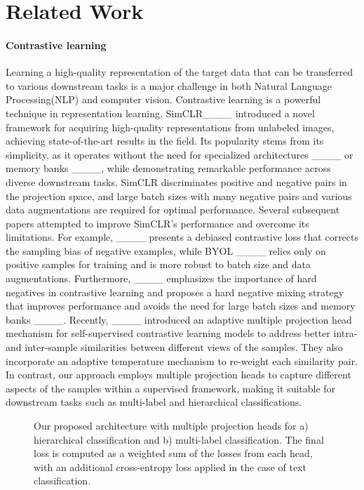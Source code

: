 \section{Related Work}
\label{relatedwork}
\paragraph{Contrastive learning}
Learning a high-quality representation of the target data that can be transferred to various downstream tasks is a major challenge in both 
Natural Language Processing(NLP) and computer vision. Contrastive learning is a powerful technique in representation learning. SimCLR____ introduced a novel framework for acquiring high-quality representations from unlabeled images, achieving state-of-the-art results in the field. Its popularity stems from its simplicity, as it operates without the need for specialized architectures ____ or memory banks ____, while demonstrating remarkable performance across diverse downstream tasks. SimCLR discriminates positive and negative pairs in the projection space, and large batch sizes with many negative pairs and various data augmentations are required for optimal performance. 
Several subsequent papers attempted to improve SimCLR’s performance and overcome its limitations. For example, ____ presents a debiased contrastive loss that corrects the sampling bias of negative examples, while BYOL ____ relies only on positive samples for training and is more robust to batch size and data augmentations. Furthermore, ____ emphasizes the importance of hard negatives in contrastive learning and proposes a hard negative mixing strategy that improves performance and avoids the need for large batch sizes and memory banks ____. Recently, ____ introduced an adaptive multiple projection head mechanism for self-supervised contrastive learning models to address better intra- and inter-sample similarities between different views of the samples. They also incorporate an adaptive temperature mechanism to re-weight each similarity pair. In contrast, our approach employs multiple projection heads to capture different aspects of the samples within a supervised framework, making it suitable for downstream tasks such as multi-label and hierarchical classifications.

\begin{figure*}
\hfill
{}
\caption{
Our proposed architecture with multiple projection heads for a) hierarchical classification and b) multi-label classification. 
The final loss is computed as a weighted sum of the losses from each head, with an additional cross-entropy loss applied in the case of text classification.
}
\end{figure*}

